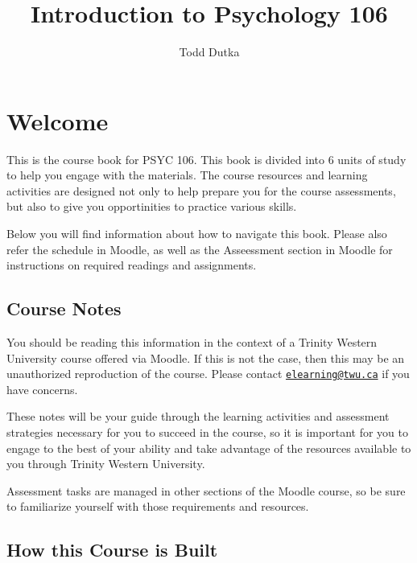 \documentclass[
]{book}
\title{Introduction to Psychology 106}
\author{Todd Dutka}
\date{}
\begin{document}
\maketitle

{
\setcounter{tocdepth}{1}
\tableofcontents
}
\hypertarget{welcome}{%
\chapter*{Welcome}\label{welcome}}

This is the course book for PSYC 106. This book is divided into 6 units of study to help you engage with the materials. The course resources and learning activities are designed not only to help prepare you for the course assessments, but also to give you opportinities to practice various skills.

Below you will find information about how to navigate this book. Please also refer the schedule in Moodle, as well as the Asseessment section in Moodle for instructions on required readings and assignments.

\hypertarget{course-notes}{%
\section*{Course Notes}\label{course-notes}}

You should be reading this information in the context of a Trinity Western University course offered via Moodle. If this is not the case, then this may be an unauthorized reproduction of the course. Please contact \href{mailto:elearning@twu.ca}{\nolinkurl{elearning@twu.ca}} if you have concerns.

These notes will be your guide through the learning activities and assessment strategies necessary for you to succeed in the course, so it is important for you to engage to the best of your ability and take advantage of the resources available to you through Trinity Western University.

Assessment tasks are managed in other sections of the Moodle course, so be sure to familiarize yourself with those requirements and resources.

\hypertarget{how-this-course-is-built}{%
\section*{How this Course is Built}\label{how-this-course-is-built}}
\end{document}
